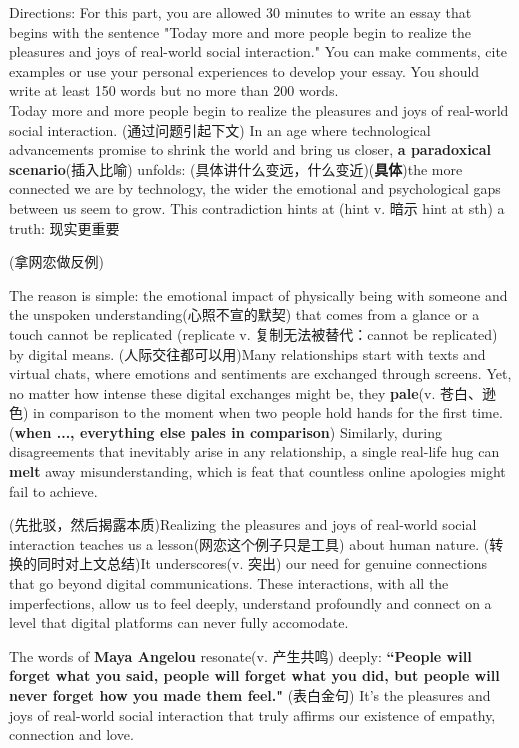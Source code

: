 Directions: For this part, you are allowed 30 minutes to write an essay that begins with the sentence "Today more and more people begin to realize the pleasures and joys of real-world social interaction." 
You can make comments, cite examples or use your personal experiences to develop your essay. You should write at least 150 words but no more than 200 words. 
~\\


Today more and more people begin to realize the pleasures and joys of real-world social interaction. 
(通过问题引起下文) In an age where technological 
advancements promise to shrink the world and 
bring us closer, \textbf{a paradoxical scenario}(插入比喻) 
unfolds: (具体讲什么变远，什么变近)(\textbf{具体})the more 
connected we are by technology, the wider the 
emotional and psychological gaps between us 
seem to grow. This contradiction hints at 
(hint v. 暗示  hint at sth)
a truth: 现实更重要


(拿网恋做反例)


The reason is simple: the emotional impact of 
physically being with someone and the unspoken 
understanding(心照不宣的默契) that comes from a 
glance or a touch cannot be replicated
(replicate v. 复制\quad 无法被替代：cannot be replicated)
 by digital means. (人际交往都可以用)Many relationships start 
 with texts and virtual chats, where emotions 
 and sentiments are exchanged through screens. 
 Yet, no matter how intense these digital 
 exchanges might be, they \textbf{pale}(v. 苍白、逊色) 
 in comparison to the moment when two people 
 hold hands for the first time.(\textbf{when
..., everything else pales in comparison}) 
Similarly, during disagreements that inevitably 
arise in any relationship, a single real-life 
hug can \textbf{melt} away misunderstanding, 
which is feat that countless online apologies 
might fail to achieve.


(先批驳，然后揭露本质)Realizing the pleasures 
and joys of real-world social interaction 
teaches us a lesson(网恋这个例子只是工具) about 
human nature. (转换的同时对上文总结)It 
underscores(v. 突出) our need for genuine 
connections that go beyond digital communications. 
These interactions, with all the imperfections, 
allow us to feel deeply, understand profoundly 
and connect on a level that digital platforms 
can never fully accomodate.


The words of \textbf{Maya Angelou} resonate(v. 产生共鸣) 
deeply: \textbf{ ``People will forget what you said, 
people will forget what you did, but people 
will never forget how you made them 
feel." }(表白金句) It's the pleasures and joys 
of real-world social interaction that truly 
affirms our existence of empathy, connection 
and love.